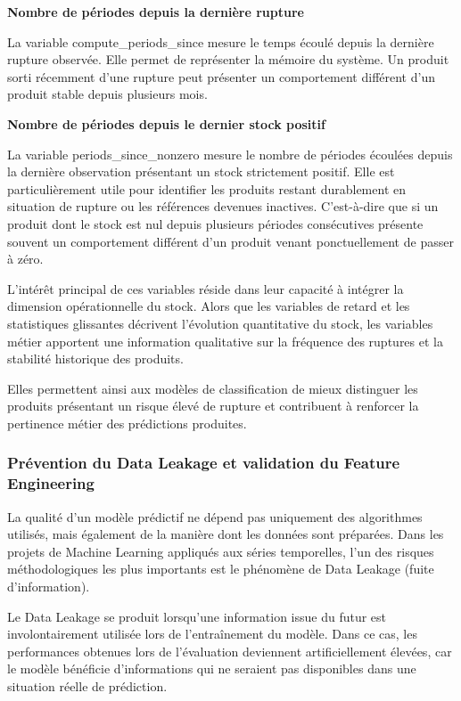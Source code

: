 \textbf{Nombre de périodes depuis la dernière rupture} 
 
La variable compute\_periods\_since mesure le temps écoulé depuis la dernière rupture observée. Elle permet de représenter la mémoire du système. Un produit sorti récemment d'une rupture peut présenter un comportement différent d'un produit stable depuis plusieurs mois.
 
\textbf{Nombre de périodes depuis le dernier stock positif} 
 
La variable periods\_since\_nonzero mesure le nombre de périodes écoulées depuis la dernière observation présentant un stock strictement positif. Elle est particulièrement utile pour identifier les produits restant durablement en situation de rupture ou les références devenues inactives. C'est-à-dire que si un produit dont le stock est nul depuis plusieurs périodes consécutives présente souvent un comportement différent d'un produit venant ponctuellement de passer à zéro.
 
L'intérêt principal de ces variables réside dans leur capacité à intégrer la dimension opérationnelle du stock. Alors que les variables de retard et les statistiques glissantes décrivent l'évolution quantitative du stock, les variables métier apportent une information qualitative sur la fréquence des ruptures et la stabilité historique des produits.
 
Elles permettent ainsi aux modèles de classification de mieux distinguer les produits présentant un risque élevé de rupture et contribuent à renforcer la pertinence métier des prédictions produites.
 
\subsubsection{Prévention du Data Leakage et validation du Feature Engineering}
 
La qualité d'un modèle prédictif ne dépend pas uniquement des algorithmes utilisés, mais également de la manière dont les données sont préparées. Dans les projets de Machine Learning appliqués aux séries temporelles, l'un des risques méthodologiques les plus importants est le phénomène de Data Leakage (fuite d'information).
 
Le Data Leakage se produit lorsqu'une information issue du futur est involontairement utilisée lors de l'entraînement du modèle. Dans ce cas, les performances obtenues lors de l'évaluation deviennent artificiellement élevées, car le modèle bénéficie d'informations qui ne seraient pas disponibles dans une situation réelle de prédiction.
 
